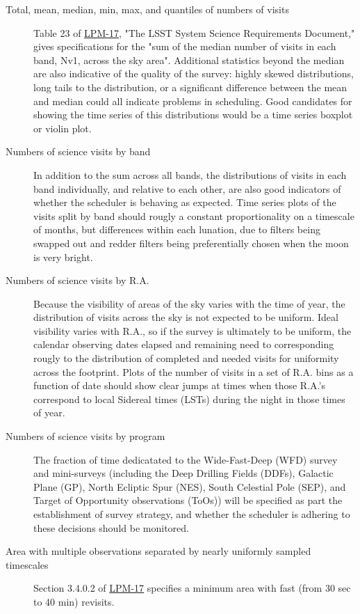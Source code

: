 \begin{description}
\item[{Total, mean, median, min, max, and quantiles of numbers of visits}] Table 23 of \href{http://ls.st/lpm-17}{LPM-17}, "The LSST System Science Requirements Document," gives specifications for the "sum of the median number of visits in each band, Nv1, across the sky area". Additional statistics beyond the median are also indicative of the quality of the survey: highly skewed distributions, long tails to the distribution, or a significant difference between the mean and median could all indicate problems in scheduling. Good candidates for showing the time series of this distributions would be a time series boxplot or violin plot.
\item[{Numbers of science visits by band}] In addition to the sum across all bands, the distributions of visits in each band individually, and relative to each other, are also good indicators of whether the scheduler is behaving as expected. Time series plots of the visits split by band should rougly a constant proportionality on a timescale of months, but differences within each lunation, due to filters being swapped out and redder filters being preferentially chosen when the moon is very bright.
\item[{Numbers of science visits by R.A.}] Because the visibility of areas of the sky varies with the time of year, the distribution of visits across the sky is not expected to be uniform. Ideal visibility varies with R.A., so if the survey is ultimately to be uniform, the calendar observing dates elapsed and remaining need to corresponding rougly to the distribution of completed and needed visits for uniformity across the footprint. Plots of the number of visits in a set of R.A. bins as a function of date should show clear jumps at times when those R.A.'s correspond to local Sidereal times (LSTs) during the night in those times of year.
\item[{Numbers of science visits by program}] The fraction of time dedicatated to the Wide-Fast-Deep (WFD) survey and mini-surveys (including the Deep Drilling Fields (DDFs), Galactic Plane (GP), North Ecliptic Spur (NES), South Celestial Pole (SEP), and Target of Opportunity observations (ToOs)) will be specified as part the establishment of survey strategy, and whether the scheduler is adhering to these decisions should be monitored.
\item[{Area with multiple observations separated by nearly uniformly sampled timescales}] Section 3.4.0.2 of \href{http://ls.st/lpm-17}{LPM-17} specifies a minimum area with fast (from 30 sec to 40 min) revisits.

\end{description}
